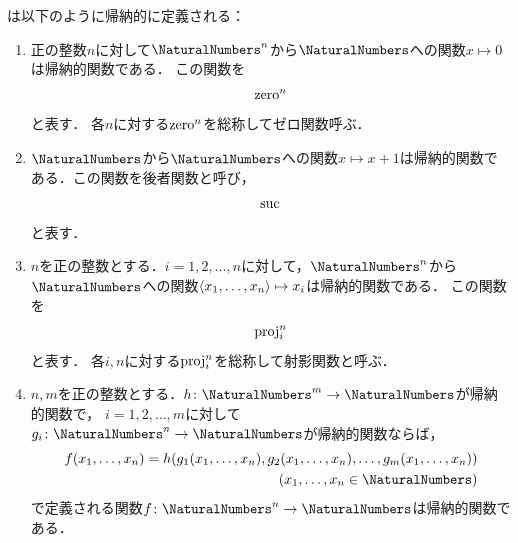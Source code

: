 \begin{Def} \label{Def:recursivefunction}
	は以下のように帰納的に定義される：
	\begin{enumerate}
		\item 正の整数\(n\)に対して\(\NaturalNumbers^n\)から\(\NaturalNumbers\)への関数\(x \mapsto 0\)は帰納的関数である．
		      この関数を
		      \begin{equation}
			      \operatorname{zero}^n
			      \label{eq:zerofunction}
		      \end{equation}
		      と表す．
		      各\(n\)に対する\(\operatorname{zero}^n\)を総称してゼロ関数呼ぶ．
		\item \(\NaturalNumbers\)から\(\NaturalNumbers\)への関数\(x \mapsto x + 1\)は帰納的関数である．この関数を後者関数と呼び，
		      \begin{equation}
			      \operatorname{suc}
			      \label{eq:sucfunction}
		      \end{equation}
		      と表す．
		\item \(n\)を正の整数とする．\(i=1,2,\dots, n\)に対して，\(\NaturalNumbers^n\)から\(\NaturalNumbers\)への関数\(\langle x_1, \dots, x_n \rangle \mapsto x_i\)は帰納的関数である．
		      この関数を
		      \begin{equation}
			      \operatorname{proj}_i^n
		      \end{equation}
		      と表す．
		      各\(i, n\)に対する\(\operatorname{proj}_i^n\)を総称して射影関数と呼ぶ．
		\item \(n,m\)を正の整数とする．\(h \colon \NaturalNumbers^m \to \NaturalNumbers\)が帰納的関数で，
		      \(i = 1,2,\dots,m\)に対して\(g_i \colon \NaturalNumbers^n \to \NaturalNumbers\)が帰納的関数ならば，
		      \begin{align*}
			      \apply{f}{x_1, \dots, x_n} = \apply{h}{
				      \apply{g_1}{x_1, \dots, x_n},
				      \apply{g_2}{x_1, \dots, x_n},
				      \dots,
				      \apply{g_m}{x_1, \dots, x_n}
			      } \\
			      \text{(\(x_1, \dots, x_n \in \NaturalNumbers\))}
		      \end{align*}
		      で定義される関数\(f \colon \NaturalNumbers^n \to \NaturalNumbers\)は帰納的関数である．

\end{enumerate}
\end{Def}
